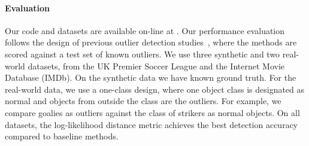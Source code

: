 \documentclass[conference]{IEEEtran}
\begin{document}
%
%
\paragraph{Evaluation} \label{sec:eval} Our code and datasets are available on-line at \cite{url}.
Our performance evaluation follows the design of previous outlier detection studies~\cite{Gao2010,aggarwal2013},
where the methods are scored against a test set of known outliers.  
%
We use three synthetic and two real-world datasets, from the UK Premier Soccer League and the Internet Movie Database (IMDb). On the synthetic data we have known ground truth. For the real-world data, we use a one-class design, where one object class is designated as normal and objects from outside the class are the outliers. For example, we compare goalies as outliers against the class of strikers as normal objects. 
On all datasets, the log-likelihood distance metric achieves the best detection accuracy compared to baseline methods. 
\end{document}
